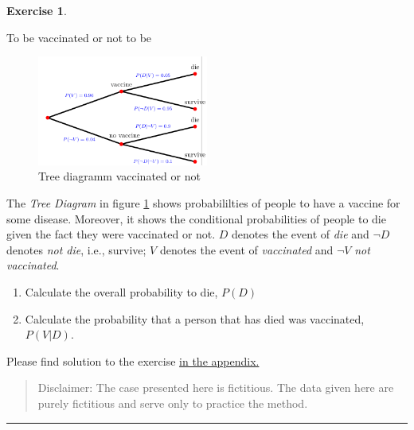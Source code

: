 \documentclass[
  12pt,
  oneside]{book}
\providecommand{\tightlist}{%
  \setlength{\itemsep}{0pt}\setlength{\parskip}{0pt}}
\theoremstyle{definition}
\theoremstyle{definition}
\theoremstyle{definition}
\newtheorem{exercise}{Exercise}[chapter]
\theoremstyle{definition}
\theoremstyle{remark}
\begin{document}
\begin{exercise}
\protect\hypertarget{exr:tobevacornot}{}\label{exr:tobevacornot}

To be vaccinated or not to be

\begin{figure}
\centering
\includegraphics[width=0.5\textwidth,height=\textheight]{fig/diesurvive.png}
\caption{\label{fig:diesurvive} Tree diagramm vaccinated or not}
\end{figure}

The \emph{Tree Diagram} in figure \ref{fig:diesurvive} shows probabililties of people to have a vaccine for some disease. Moreover, it shows the conditional probabilities of people to die given the fact they were vaccinated or not.
\(D\) denotes the event of \emph{die} and \(\neg D\) denotes \emph{not die}, i.e., survive; \(V\) denotes the event of \emph{vaccinated} and \(\neg V\) \emph{not vaccinated}.

\begin{enumerate}
\def\labelenumi{\alph{enumi})}
\tightlist
\item
  Calculate the overall probability to die, \(P(D)\)
\item
  Calculate the probability that a person that has died was vaccinated, \(P(V|D)\).
\end{enumerate}

Please find solution to the exercise \protect\hyperlink{sol:tobevacornot}{in the appendix.}

\begin{quote}
Disclaimer: The case presented here is fictitious. The data given here are purely fictitious and serve only to practice the method.
\end{quote}

\begin{center}\rule{0.5\linewidth}{0.5pt}\end{center}

\end{exercise}
\end{document}
